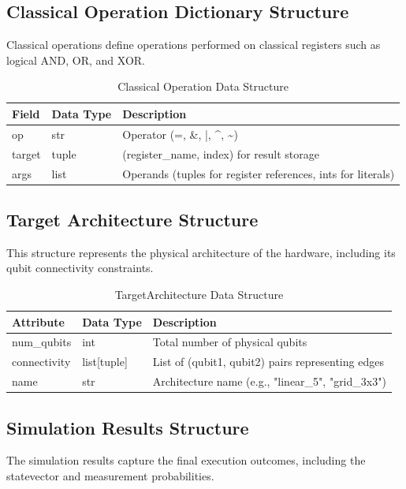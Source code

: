 \subsection{Classical Operation Dictionary Structure}
Classical operations define operations performed on classical registers such as logical AND, OR, and XOR.

\begin{table}[H]
\centering
\caption{Classical Operation Data Structure}
\begin{tabular}{|p{3cm}|p{2.5cm}|p{7cm}|}
\hline
\textbf{Field} & \textbf{Data Type} & \textbf{Description} \\
\hline
op & str & Operator (=, \&, |, \^{}, \~{}) \\
\hline
target & tuple & (register\_name, index) for result storage \\
\hline
args & list & Operands (tuples for register references, ints for literals) \\
\hline
\end{tabular}
\end{table}

\subsection{Target Architecture Structure}
This structure represents the physical architecture of the hardware, including its qubit connectivity constraints.

\begin{table}[H]
\centering
\caption{TargetArchitecture Data Structure}
\begin{tabular}{|p{3cm}|p{2.5cm}|p{7cm}|}
\hline
\textbf{Attribute} & \textbf{Data Type} & \textbf{Description} \\
\hline
num\_qubits & int & Total number of physical qubits \\
\hline
connectivity & list[tuple] & List of (qubit1, qubit2) pairs representing edges \\
\hline
name & str & Architecture name (e.g., "linear\_5", "grid\_3x3") \\
\hline
\end{tabular}
\end{table}

\subsection{Simulation Results Structure}
The simulation results capture the final execution outcomes, including the statevector and measurement probabilities.

